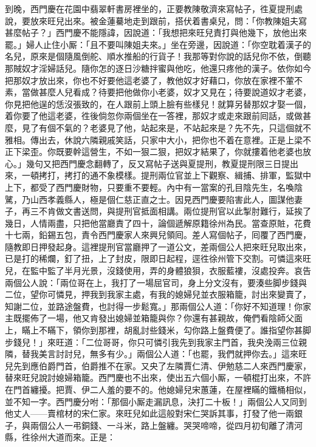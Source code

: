 到晚，西門慶在花園中翡翠軒書房裡坐的，正要教陳敬濟來寫帖子，徃夏提刑處說，要放來旺兒出來。被金蓮驀地走到跟前，搭伏着書桌兒，{}問：「你教陳姐夫寫甚麼帖子？」西門慶不能隱諱，因說道：「我想把來旺兒責打與他幾下，放他出來罷。」婦人止住小厮：「且不要叫陳姐夫來。」坐在旁邊，因說道：「你空耽着漢子的名兒，原來是個隨風倒舵、順水推船的行貨子！我那等對你說的話兒你不依，倒聽那賊奴才淫婦話兒。隨你怎的逐日沙糖拌蜜與他吃，他還只疼他的漢子。依你如今把那奴才放出來，你也不好要他這老婆了，教他奴才好藉口，你放在家裡不葷不素，當做甚麼人兒看成？待要把他做你小老婆，奴才又見在；待要說道奴才老婆，你見把他逞的恁沒張致的，在人跟前上頭上臉有些樣兒！就算另替那奴才娶一個，着你要了他這老婆，徃後倘忽你兩個坐在一答裡，那奴才或走來跟前囘話，或做甚麼，見了有個不氣的？老婆見了他，站起來是，不站起來是？先不先，只這個就不雅相。{}傳出去，休說六隣親戚笑話，只家中大小，把你也不着在意裡。正是上梁不正下梁歪。你既要幹這營生，不如一狠二狠，把奴才結果了，{}你就摟着他老婆也放心。」{}幾句又把西門慶念翻轉了，反又寫帖子送與夏提刑，教夏提刑限三日提出來，一頓拷打，拷打的通不象模樣。提刑兩位官並上下觀察、緝捕、排軍，監獄中上下，都受了西門慶財物，只要重不要輕。內中有一當案的孔目陰先生，名喚陰騭，乃山西孝義縣人，極是個仁慈正直之士。因見西門慶要陷害此人，圖謀他妻子，再三不肯做文書送問，與提刑官抵面相講。兩位提刑官以此掣肘難行，延挨了幾日，人情兩盡，只把他當廳責了四十，論個遞解原籍徐州為民。當查原賍，花費十七兩，鉛錫五包，責令西門慶家人來興兒領囘。差人寫個帖子，囘覆了西門慶，隨教即日押發起身。這裡提刑官當廳押了一道公文，差兩個公人把來旺兒取出來，已是打的稀爛，釘了扭，上了封皮，限即日起程，逕徃徐州管下交割。可憐這來旺兒，在監中監了半月光景，沒錢使用，弄的身體狼狽，衣服藍褸，沒處投奔。哀告兩個公人說：「兩位哥在上，我打了一場屈官司，身上分文沒有，要湊些脚步錢與二位，望你可憐見，押我到我家主處，有我的媳婦兒並衣服箱籠，討出來變賣了，知謝二位，並路途盤費，也討得一步鬆寬。」那兩個公人道：「你好不知道理！你家主既擺佈了一場，他又肯發出媳婦並箱籠與你？{}你還有甚親故，俺們看陰師父面上，瞞上不瞞下，領你到那裡，胡亂討些錢米，勾你路上盤費便了。誰指望你甚脚步錢兒！」來旺道：「二位哥哥，你只可憐引我先到我家主門首，我央浼兩三位親隣，替我美言討討兒，無多有少。」兩個公人道：「也罷，我們就押你去。」這來旺兒先到應伯爵門首，伯爵推不在家。{}又央了左隣賈仁清、伊勉慈二人來西門慶家，替來旺兒說討媳婦箱籠。西門慶也不出來，使出五六個小厮，一頓棍打出來，不許在門首纏擾。把賈、伊二人羞的要不的。他媳婦兒宋蕙蓮，在屋裡瞞的鐵桶相似，並不知一字。西門慶分咐：「那個小厮走漏訊息，決打二十板！」兩個公人又同到他丈人——賣棺材的宋仁家。來旺兒如此這般對宋仁哭訴其事，打發了他一兩銀子，與兩個公人一弔銅錢、一斗米，路上盤纏。哭哭啼啼，從四月初旬離了清河縣，徃徐州大道而來。正是：

